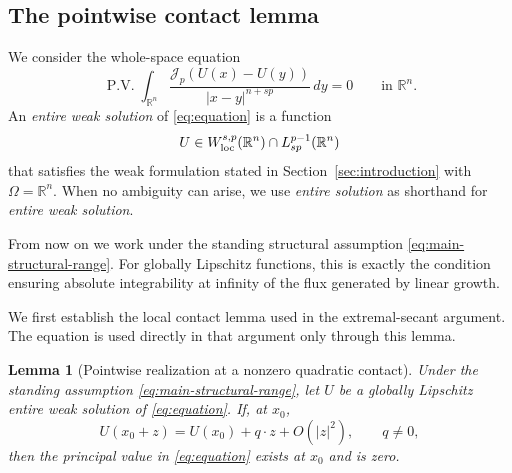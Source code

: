 \documentclass[11pt,reqno]{amsart}
\numberwithin{equation}{section}
\newcommand{\R}{\mathbb R}
\newcommand{\Jp}{\mathcal J_p}
\newcommand{\dd}{\,d}
\newtheorem{lemma}[theorem]{Lemma}
\theoremstyle{remark}
\begin{document}
\subsection{The pointwise contact lemma}
\label{subsec:pointwise-contact}

We consider the whole-space equation
\begin{equation}
 \operatorname{P.V.}\int_{\R^n}
 \frac{\Jp(U(x)-U(y))}{|x-y|^{n+sp}}\dd y=0
 \qquad\text{in }\R^n.
 \label{eq:equation}
\end{equation}
An \emph{entire weak solution} of \eqref{eq:equation} is a function
\[
 U\in W_{\rm loc}^{s,p}(\R^n)\cap L_{sp}^{p-1}(\R^n)
\]
that satisfies the weak formulation stated in
Section~\ref{sec:introduction} with \(\Omega=\R^n\).  When no ambiguity
can arise, we use \emph{entire solution} as shorthand for
\emph{entire weak solution}.

From now on we work under the standing structural assumption
\eqref{eq:main-structural-range}.  For globally Lipschitz functions,
this is exactly the condition ensuring absolute integrability at
infinity of the flux generated by linear growth.

We first establish the local contact lemma used in the
extremal-secant argument.  The equation is used directly in that
argument only through this lemma.

\begin{lemma}[Pointwise realization at a nonzero quadratic contact]
\label{lem:pointwise-contact}
Under the standing assumption \eqref{eq:main-structural-range}, let
$U$ be a globally Lipschitz entire weak solution of
\eqref{eq:equation}.  If, at $x_0$,
\[
 U(x_0+z)=U(x_0)+q\cdot z+O(|z|^2),
 \qquad q\ne0,
\]
then the principal value in \eqref{eq:equation} exists at $x_0$ and is
zero.
\end{lemma}
\end{document}

